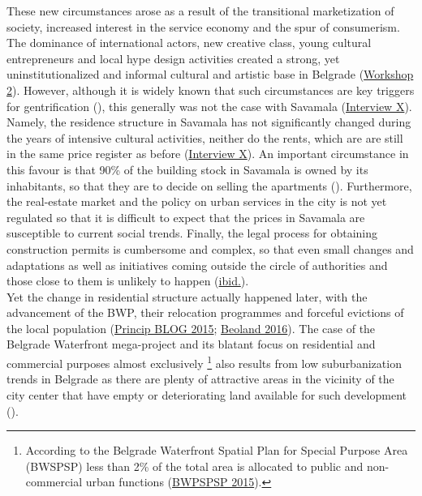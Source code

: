 \documentclass[11pt]{report}
\begin{document}
{{{{These new circumstances arose as a result of the transitional marketization of society, increased interest in the service economy and the spur of consumerism. The dominance of international actors, new creative class, young cultural entrepreneurs and local hype design activities created a strong, yet uninstitutionalized and informal cultural and artistic base in Belgrade (\href{PHD Workshop}{Workshop 2}).
However, although it is widely known that such circumstances are key triggers for gentrification  (\href{ref}{\citealt{krusche_gentrification_2015}}),
this generally was not the case with Savamala (\href{InterviewX}{Interview X}).
Namely, the residence structure in Savamala has not significantly changed during the years of intensive cultural activities, neither do the rents, which are are still in the same price register as before (\href{InterviewX}{Interview X}).
An important circumstance in this favour is that 90\% of the building stock in Savamala is owned by its inhabitants, so that they are to decide on selling the apartments (\href{ref}{\citealt{krusche_role_2015}}).
Furthermore, the real-estate market and the policy on urban services in the city is not yet regulated so that it is difficult to expect that the prices in Savamala are susceptible to current social trends.
Finally, the legal process for obtaining construction permits is cumbersome and complex, so that even small changes and adaptations as well as initiatives coming outside the circle of authorities and those close to them is unlikely to happen (\href{Klaus}{ibid.}).
\\

Yet the change in residential structure actually happened later,  with the advancement of the BWP, their relocation programmes and forceful evictions of the local population (\href{Princip}{Princip BLOG 2015}; \href{Beoland}{Beoland 2016}).
The case of the Belgrade Waterfront mega-project and its blatant focus on residential and commercial purposes almost exclusively
\footnote{According to the Belgrade Waterfront Spatial Plan for Special Purpose Area (BWSPSP) less than 2\% of the total area is allocated to public and non-commercial urban functions (\href{PPPPN}{BWPSPSP 2015}).}
also results from low suburbanization trends in Belgrade as there are plenty of attractive areas in the vicinity of the city center that have empty or deteriorating land available for such development (\href{ref}{\citealt{hirt_belgrade_2009}}).
\\

}}}}
\end{document}
